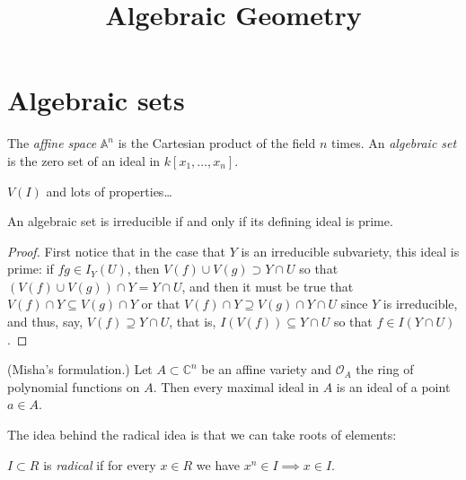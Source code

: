 



\title{Algebraic Geometry}
\maketitle

\label{section-phantom}

\tableofcontents

\section{Algebraic sets}
\label{section-algebraic-sets}

\noindent
The {\it affine space} $\mathbb{A}^n$ is the
Cartesian
product of the field $n$ times.
An {\it algebraic set} is the zero set of an
ideal
in $k[x_1,…,x_n]$.

$V(I)$ and lots of properties…

\begin{lemma}
\label{lemma-irreducible-variety-prime-ideal}
An algebraic set is irreducible if and only
if
its defining ideal is prime.
\end{lemma}

\begin{proof}
First notice that in
the case that $Y$ is an irreducible
subvariety,
this ideal is prime: if $fg \in I_Y(U)$,
then $V(f) \cup  V(g) \supset Y\cap U$
so that $(V(f) \cup  V(g))\cap Y = Y\cap U$,
and then it must be true that $V(f)\cap
Y\subseteq V(g)\cap Y$
or that $V(f)\cap Y \supseteq V(g)\cap Y \cap
U$
since $Y$ is irreducible, and thus, say,
$V(f)\supseteq Y \cap U$,
that is, $I(V(f))\subseteq Y \cap U$
so that $f \in I(Y \cap U)$.
\end{proof}

\begin{theorem}
\label{theorem-weak-nullstellensatz}
(Misha's formulation.) Let $A \subset
\mathbb{C}^n$
be an affine variety and $\mathcal{O}_A$ the
ring of polynomial
functions on $A$.
Then every maximal ideal in $A$
is an ideal of a point $a \in A$.
\end{theorem}

\noindent
The idea behind the radical idea is that
we can take roots of elements:

\begin{definition}
\label{definition-radical-ideal}
$I \subset R$ is {\it radical}
if for every $x \in R$ we have $x^n \in I
\implies x \in I$.
\end{definition}

